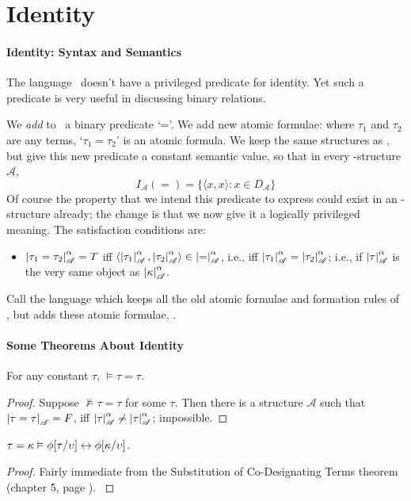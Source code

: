 

	\section{Identity}

	
	\paragraph{Identity: Syntax and Semantics}

	The language \ltwo\ doesn't have a privileged predicate for identity. Yet such a predicate is very useful in discussing binary relations. 

	We \emph{add} to \ltwo\ a binary predicate `='. We add  new atomic formulae: where $\tau_{1}$ and $\tau_{2}$ are any terms, `$\tau_{1}=\tau_{2}$' is an atomic formula.  We keep the same structures as \ltwo, but give this new predicate a constant semantic value, so that in every \ltwo-structure $\mathscr{A}$, \begin{equation}
		I_{\mathscr{A}}({=}) = \{\langle x,x\rangle : x \in D_{\mathscr{A}}\} \tag{=}
	\end{equation}
	Of course the property that we intend this predicate to express could exist in an \ltwo-structure already; the change is that we now  give it a logically privileged meaning.
	The satisfaction conditions are: \begin{itemize}
	\item	$\left|\tau_{1}=\tau_{2}\right|^{\alpha}_{\mathscr{A}}=T$ iff $\langle \left|\tau_{1}\right|^{\alpha}_{\mathscr{A}},\left|\tau_{2}\right|^{\alpha}_{\mathscr{A}}\rangle \in \left|{=}\right|^{\alpha}_{\mathscr{A}}$, i.e., iff $\left|\tau_{1}\right|^{\alpha}_{\mathscr{A}}=\left|\tau_{2}\right|^{\alpha}_{\mathscr{A}}$; i.e., if $\left|\tau\right|^{\alpha}_{\mathscr{A}}$ is the very same object as $\left|\kappa\right|^{\alpha}_{\mathscr{A}}$.
	\end{itemize}

	Call the language which keeps all the old atomic formulae and formation rules of \ltwo, but adds these atomic formulae, \emph{\lequ}. 
	
\paragraph{Some Theorems About Identity}

\begin{theorem}
	For any constant $\tau$, $\vDash \tau=\tau$. \begin{proof}
		Suppose $\not\vDash\tau=\tau$ for some $\tau$. Then there is a structure $\mathscr{A}$ such that $\left|\tau=\tau\right|_{\mathscr{A}}=F$, iff $\left|\tau\right|^{\alpha}_{\mathscr{A}}\neq\left|\tau\right|^{\alpha}_{\mathscr{A}}$; impossible.
	\end{proof}
\end{theorem} \begin{theorem}
	$\tau=\kappa\vDash \phi[\tau/\upsilon] \leftrightarrow \phi[\kappa/\upsilon]$. \begin{proof}Fairly immediate from the Substitution of Co-Designating Terms theorem (chapter 5, page \pageref{fivesubcod}). \label{scdc}
	\end{proof}
\end{theorem}


